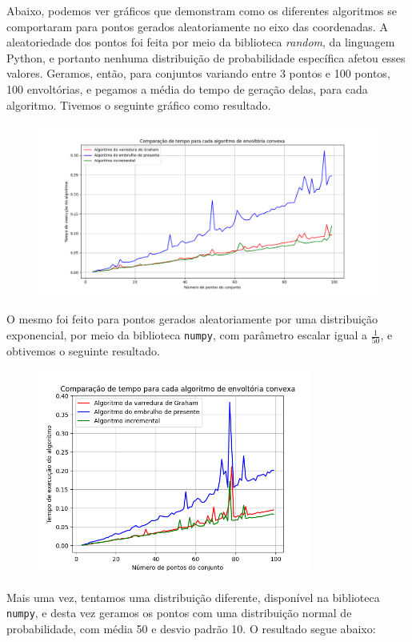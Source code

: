 \documentclass{article}
\begin{document}
Abaixo, podemos ver gráficos que demonstram como os diferentes algoritmos se comportaram para pontos gerados aleatoriamente no eixo das coordenadas. A aleatoriedade dos pontos foi feita por meio da biblioteca \textit{random}, da linguagem Python, e portanto nenhuma distribuição de probabilidade específica afetou esses valores. Geramos, então, para conjuntos variando entre 3 pontos e 100 pontos, 100 envoltórias, e pegamos a média do tempo de geração delas, para cada algoritmo. Tivemos o seguinte gráfico como resultado.

\begin{figure} [H]
	\includegraphics[width=12cm]{uniform.png}
	\centering
\end{figure}

O mesmo foi feito para pontos gerados aleatoriamente por uma distribuição exponencial, por meio da biblioteca \texttt{numpy}, com parâmetro escalar igual a \( \frac{1}{50} \), e obtivemos o seguinte resultado.

\begin{figure} [H]
	\includegraphics[width=9cm]{exponential.png}
	\centering
\end{figure}

Mais uma vez, tentamos uma distribuição diferente, disponível na biblioteca \texttt{numpy}, e desta vez geramos os pontos com uma distribuição normal de probabilidade, com média 50 e desvio padrão 10. O resultado segue abaixo:
\end{document}
